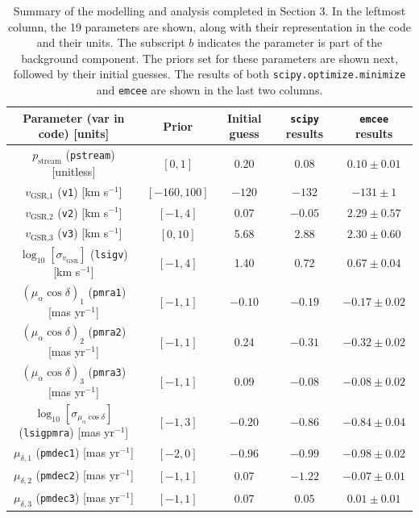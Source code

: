 \documentclass{article}
\begin{document}
\vspace{-0.5em}
\begin{table}[h]
\begin{center}
\caption{Summary of the modelling and analysis completed in Section 3. In the leftmost column, the 19 parameters are shown, along with their representation in the code and their units. The subscript $b$ indicates the parameter is part of the background component. The priors set for these parameters are shown next, followed by their initial guesses. The results of both \texttt{scipy.optimize.minimize} and \texttt{emcee} are shown in the last two columns.}
\label{table:1}
\vspace{1em}
\begin{tabular}{ |c|c|c|c|c| } 
\hline
Parameter (var in code) [units] & Prior & Initial guess &\texttt{scipy} results & \texttt{emcee} results\\
\hline
$p_\text{stream}$ (\texttt{pstream}) [unitless] & $[0,1]$ & 0.20 & 0.08 & $0.10\pm0.01$\\
$v_\text{GSR,1}$ (\texttt{v1}) [km s$^{-1}$]& $[-160,100]$ & $-120$ & $-132$ & $-131\pm1$\\
$v_\text{GSR,2}$ (\texttt{v2}) [km s$^{-1}$]& $[-1,4]$ & 0.07 & $-0.05$ & $2.29\pm0.57$\\
$v_\text{GSR,3}$ (\texttt{v3}) [km s$^{-1}$]& $[0,10]$ & 5.68 & 2.88 & $2.30\pm0.60$\\
$\log_{10}[\sigma_{v_\text{GSR}}]$ (\texttt{lsigv}) [km s$^{-1}$]& $[-1,4]$ & 1.40 & 0.72 & $0.67\pm0.04$\\
$(\mu_\alpha\cos\delta)_1$ (\texttt{pmra1}) [mas yr$^{-1}$]& $[-1,1]$ & $-0.10$ & $-0.19$ & $-0.17\pm0.02$\\
$(\mu_\alpha\cos\delta)_2$  (\texttt{pmra2}) [mas yr$^{-1}$]& $[-1,1]$ & 0.24 & $-0.31$ & $-0.32\pm0.02$\\
$(\mu_\alpha\cos\delta)_3$  (\texttt{pmra3}) [mas yr$^{-1}$]& $[-1,1]$ & 0.09 & $-0.08$ & $-0.08\pm0.02$\\
$\log_{10}[\sigma_{\mu_\alpha\cos\delta}]$ (\texttt{lsigpmra}) [mas yr$^{-1}$]& $[-1,3]$ & $-0.20$ & $-0.86$ & $-0.84\pm0.04$\\
$\mu_{\delta,1}$ (\texttt{pmdec1}) [mas yr$^{-1}$]& $[-2,0]$ & $-0.96$ & $-0.99$ & $-0.98\pm0.02$\\
$\mu_{\delta,2}$ (\texttt{pmdec2}) [mas yr$^{-1}$]& $[-1,1]$ & 0.07 & $-1.22$ & $-0.07\pm0.01$\\
$\mu_{\delta,3}$ (\texttt{pmdec3}) [mas yr$^{-1}$]& $[-1,1]$ & 0.07 & $0.05$ & $0.01\pm0.01$\\

\end{tabular}
\end{center}
\end{table}
\end{document}
